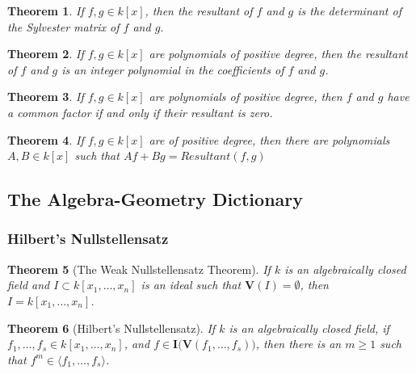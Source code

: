 \documentclass{article}
\theoremstyle{mystyle}
\newtheorem{theorem}{Theorem}[section]
\begin{document}
\begin{theorem}
If $f,g \in k[x]$, then the resultant of $f$ and $g$ is the determinant of the Sylvester matrix of $f$ and $g$.
\end{theorem}
\begin{theorem}
If $f,g\in k[x]$ are polynomials of positive degree, then the resultant of $f$ and $g$ is an integer polynomial in the coefficients of $f$ and $g$.
\end{theorem}
\begin{theorem}
If $f,g\in k[x]$ are polynomials of positive degree, then $f$ and $g$ have a common factor if and only if their resultant is zero.
\end{theorem}
\begin{theorem}
If $f,g\in k[x]$ are of positive degree, then there are polynomials $A,B \in k[x]$ such that $Af + Bg = Resultant(f,g)$
\end{theorem}
\subsection{The Algebra-Geometry Dictionary}
\subsubsection{Hilbert's Nullstellensatz}
\begin{theorem}[The Weak Nullstellensatz Theorem]
If $k$ is an algebraically closed field and $I \subset k[x_1,\hdots ,x_n]$ is an ideal such that $\mathbf{V}(I) = \emptyset$, then $I = k[x_1,\hdots ,x_n]$.
\end{theorem}
\begin{theorem}[Hilbert's Nullstellensatz]
If $k$ is an algebraically closed field, if $f_1,\hdots, f_s\in k[x_1,\hdots ,x_n]$, and $f\in \textbf{I}\big(\mathbf{V}(f_1,\hdots, f_s)\big)$, then there is an $m\geq 1$ such that $f^m \in \langle f_1,\hdots, f_s \rangle$.
\end{theorem}
\end{document}
